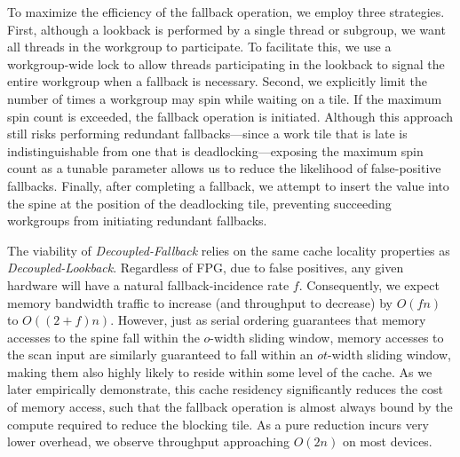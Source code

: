 \documentclass[sigconf]{acmart}
\begin{document}
To maximize the efficiency of the fallback operation, we employ three strategies. First, although a lookback is performed by a single thread or subgroup, we want all threads in the workgroup to participate. To facilitate this, we use a workgroup-wide lock to allow threads participating in the lookback to signal the entire workgroup when a fallback is necessary. Second, we explicitly limit the number of times a workgroup may spin while waiting on a tile. If the maximum spin count is exceeded, the fallback operation is initiated. Although this approach still risks performing redundant fallbacks---since a work tile that is late is indistinguishable from one that is deadlocking---exposing the maximum spin count as a tunable parameter allows us to reduce the likelihood of false-positive fallbacks. Finally, after completing a fallback, we attempt to insert the value into the spine at the position of the deadlocking tile, preventing succeeding workgroups from initiating redundant fallbacks.

The viability of \emph{Decoupled-Fallback} relies on the same cache locality properties as \emph{Decoupled-Lookback}. Regardless of FPG, due to false positives, any given hardware will have a natural fallback-incidence rate $f$. Consequently, we expect memory bandwidth traffic to increase (and throughput to decrease) by $O(fn)$ to $O((2 + f)n)$. However, just as serial ordering guarantees that memory accesses to the spine fall within the $o$-width sliding window, memory accesses to the scan input are similarly guaranteed to fall within an $ot$-width sliding window, making them also highly likely to reside within some level of the cache. As we later empirically demonstrate, this cache residency significantly reduces the cost of memory access, such that the fallback operation is almost always bound by the compute required to reduce the blocking tile. As a pure reduction incurs very lower overhead, we observe throughput approaching $O(2n)$ on most devices.
\end{document}
